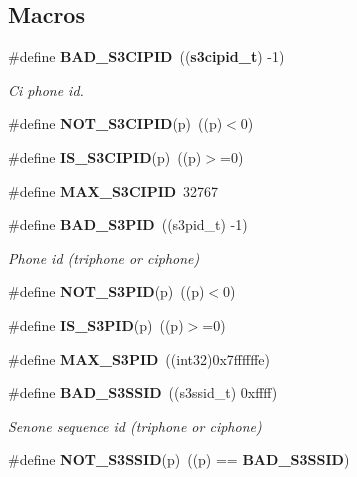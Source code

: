 \subsection*{Macros}
\begin{DoxyCompactItemize}
\item 
\#define {\bf B\-A\-D\-\_\-\-S3\-C\-I\-P\-I\-D}~(({\bf s3cipid\-\_\-t}) -\/1)\label{s3types_8h_af9c51863cdbb10d58b6aad21e896666b}

\begin{DoxyCompactList}\small\item\em Ci phone id. \end{DoxyCompactList}\item 
\#define {\bfseries N\-O\-T\-\_\-\-S3\-C\-I\-P\-I\-D}(p)~((p)$<$0)\label{s3types_8h_ad7a2359e1e705906c58fe33f9729f6ce}

\item 
\#define {\bfseries I\-S\-\_\-\-S3\-C\-I\-P\-I\-D}(p)~((p)$>$=0)\label{s3types_8h_af719889a0db4f4f0b4b2ac9201bbe7cd}

\item 
\#define {\bfseries M\-A\-X\-\_\-\-S3\-C\-I\-P\-I\-D}~32767\label{s3types_8h_a453101a056aef746b77e9768a1cb60a5}

\item 
\#define {\bf B\-A\-D\-\_\-\-S3\-P\-I\-D}~((s3pid\-\_\-t) -\/1)\label{s3types_8h_a4037acb07f1abc6c8a1aac0841556440}

\begin{DoxyCompactList}\small\item\em Phone id (triphone or ciphone) \end{DoxyCompactList}\item 
\#define {\bfseries N\-O\-T\-\_\-\-S3\-P\-I\-D}(p)~((p)$<$0)\label{s3types_8h_ae3dad97c1cf3e6347c347bf633ee27dd}

\item 
\#define {\bfseries I\-S\-\_\-\-S3\-P\-I\-D}(p)~((p)$>$=0)\label{s3types_8h_afe39bcb2b878fb92ebd7b3e249304264}

\item 
\#define {\bfseries M\-A\-X\-\_\-\-S3\-P\-I\-D}~((int32)0x7ffffffe)\label{s3types_8h_a1141ddc85d582a6e1a1c70609baab281}

\item 
\#define {\bf B\-A\-D\-\_\-\-S3\-S\-S\-I\-D}~((s3ssid\-\_\-t) 0xffff)\label{s3types_8h_ade0bee313d69b3d324b5622fa0507ec7}

\begin{DoxyCompactList}\small\item\em Senone sequence id (triphone or ciphone) \end{DoxyCompactList}\item 
\#define {\bfseries N\-O\-T\-\_\-\-S3\-S\-S\-I\-D}(p)~((p) == {\bf B\-A\-D\-\_\-\-S3\-S\-S\-I\-D})\label{s3types_8h_a970be643bdeb0467b4bab2395d76293b}


\end{DoxyCompactItemize}
